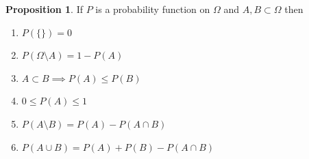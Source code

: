 \documentclass[twoside,11pt,a4paper]{article}
\newif\ifEN \ENtrue	                %
\def\tr|#1|#2|{\ifEN #2\else #1\fi}     %
\theoremstyle{definition}
\newtheorem{prop}{Proposition}
\begin{document}
\begin{prop}
  \tr|Wenn $P$ ein Wahrscheinlichkeitsfunktion auf $\Omega$ ist, und $A,B\subset\Omega$ dann gilt
  |If $P$ is a probability function on $\Omega$ and  $A,B\subset \Omega$ then|
  \begin{enumerate}
  \item $P(\{\})=0$
  \item $P(\Omega\setminus A)=1-P(A)$
  \item $A\subset B\implies P(A)\leq P(B)$
  \item $0\leq P(A)\leq 1$
  \item $P(A\setminus B)=P(A)-P(A\cap B)$
  \item $P(A\cup B)=P(A)+P(B)-P(A\cap B)$
  \end{enumerate}
\end{prop}
\end{document}
